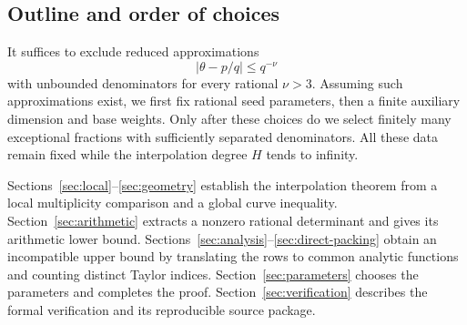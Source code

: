 \subsection{Outline and order of choices}

It suffices to exclude reduced approximations
\begin{equation}\label{eq:exceptional}
                         |\theta-p/q|\leq q^{-\nu}
\end{equation}
with unbounded denominators for every rational \(\nu>3\).
Assuming such approximations exist, we first fix rational seed
parameters, then a finite auxiliary dimension and base weights.
Only after these choices do we select finitely many exceptional
fractions with sufficiently separated denominators.
All these data remain fixed while the interpolation degree \(H\)
tends to infinity.

Sections~\ref{sec:local}--\ref{sec:geometry} establish the
interpolation theorem from a local multiplicity comparison and a
global curve inequality. Section~\ref{sec:arithmetic} extracts a
nonzero rational determinant and gives its arithmetic lower bound.
Sections~\ref{sec:analysis}--\ref{sec:direct-packing} obtain an
incompatible upper bound by translating the rows to common analytic
functions and counting distinct Taylor indices.
Section~\ref{sec:parameters} chooses the parameters and completes
the proof. Section~\ref{sec:verification} describes the formal
verification and its reproducible source package.
